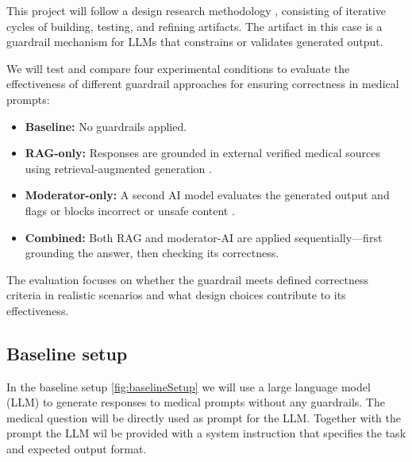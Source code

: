 %

This project will follow a design research methodology \citep{wieringa2014design}, consisting of iterative cycles of building, testing, and refining artifacts.
The artifact in this case is a guardrail mechanism for LLMs that constrains or validates generated output.

We will test and compare four experimental conditions to evaluate the effectiveness of different guardrail approaches for ensuring correctness in medical prompts:

\begin{itemize}
    \item \textbf{Baseline:} No guardrails applied.
    \item \textbf{RAG-only:} Responses are grounded in external verified medical sources using retrieval-augmented generation \citep{dong2024guardrails}.
    \item \textbf{Moderator-only:} A second AI model evaluates the generated output and flags or blocks incorrect or unsafe content \citep{inan2023llamaguard}.
    \item \textbf{Combined:} Both RAG and moderator-AI are applied sequentially—first grounding the answer, then checking its correctness.
\end{itemize}

The evaluation focuses on whether the guardrail meets defined correctness criteria in realistic scenarios and what design choices contribute to its effectiveness.

\subsection{Baseline setup}
In the baseline setup \ref{fig:baselineSetup} we will use a large language model (LLM) to generate responses to medical prompts without any guardrails.
The medical question will be directly used as prompt for the LLM.
Together with the prompt the LLM wil be provided with a system instruction that specifies the task and expected output format.

